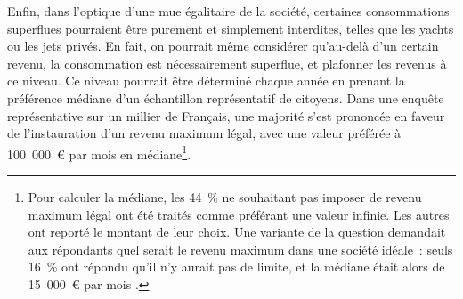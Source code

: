 \documentclass[a5paper,french,openany]{memoir}
\begin{document}

Enfin, dans l'optique d'une mue égalitaire de la société, certaines consommations superflues pourraient être purement et simplement interdites, telles que les yachts ou les jets privés. En fait, on pourrait même considérer qu'au-delà d'un certain revenu, la consommation est nécessairement superflue, et plafonner les revenus à ce niveau. Ce niveau pourrait être déterminé chaque année en prenant la préférence médiane d'un échantillon représentatif de citoyens. Dans une enquête représentative sur un millier de Français, une majorité s'est prononcée en faveur de l'instauration d'un revenu maximum légal, avec une valeur préférée à 100~000~\euro{} par mois en médiane\footnote{Pour calculer la médiane, les 44~\% ne souhaitant pas imposer de revenu maximum légal ont été traités comme préférant une valeur infinie. Les autres ont reporté le montant de leur choix. Une variante de la question demandait aux répondants quel serait le revenu maximum dans une société idéale~: seuls 16~\% ont répondu qu'il n'y aurait pas de limite, et la médiane était alors de 15~000~\euro{} par mois \citep{fabre_determiner_2022}.}. 
\end{document}
